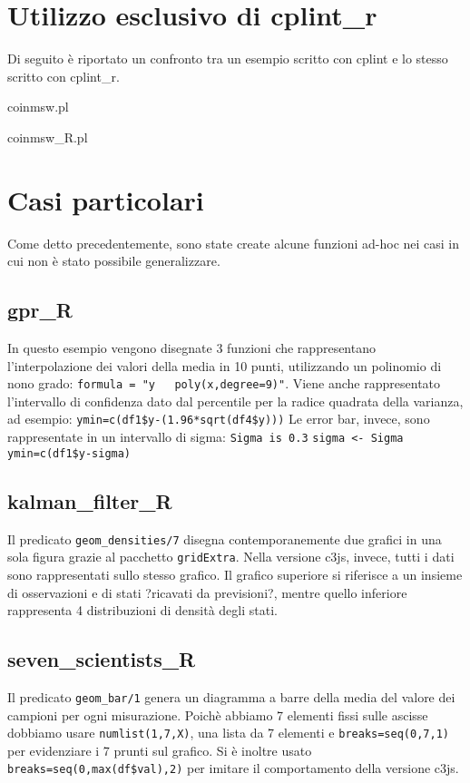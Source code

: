 \documentclass[10pt,titlepage,twoside,a4paper]{report}
\newenvironment{code}{\singlespacing\captionsetup{type=listing}}{}
\begin{document}
\section{Utilizzo esclusivo di cplint\_r}
Di seguito è riportato un confronto tra un esempio scritto
con cplint e lo stesso scritto con cplint\_r.

\begin{code}
    \caption{coinmsw.pl}
\end{code}
\begin{code}
    \caption{coinmsw\_R.pl}
\end{code}



\section{Casi particolari} \label{sec:case-particolari}
Come detto precedentemente, sono state create alcune funzioni ad-hoc
nei casi in cui non è stato possibile generalizzare.

\subsection{gpr\_R}
In questo esempio vengono disegnate 3 funzioni che rappresentano 
l'interpolazione dei valori della media in 10 punti, utilizzando un polinomio 
di nono grado: \texttt{formula = "y ~ poly(x,degree=9)"}. Viene anche 
rappresentato l'intervallo di confidenza dato dal percentile per la radice 
quadrata della varianza, ad esempio: \texttt{ymin=c(df1\$y-(1.96*sqrt(df4\$y)))}
Le error bar, invece, sono rappresentate in un intervallo di sigma:
\texttt{Sigma is 0.3} \texttt{sigma <- Sigma} \texttt{ymin=c(df1\$y-sigma)}


\subsection{kalman\_filter\_R}
Il predicato \texttt{geom\_densities/7} disegna contemporanemente
due grafici in una sola figura grazie al pacchetto
\texttt{gridExtra}\cite{gridExtra}. Nella versione c3js, invece, tutti i dati 
sono rappresentati sullo stesso grafico.
Il grafico superiore si riferisce a un insieme di osservazioni e di stati 
?ricavati da previsioni?, mentre quello inferiore rappresenta 4 distribuzioni 
di densità degli stati.

\subsection{seven\_scientists\_R}
Il predicato \texttt{geom\_bar/1}  genera un diagramma a barre 
della media del valore dei campioni per ogni misurazione. Poichè 
abbiamo 7 elementi fissi sulle ascisse dobbiamo usare \texttt{numlist(1,7,X)}, 
una lista da 7 elementi e \texttt{breaks=seq(0,7,1)} per evidenziare i 7 
prunti sul grafico. Si è inoltre usato \texttt{breaks=seq(0,max(df\$val),2)} 
per imitare il comportamento della versione c3js.
\end{document}
